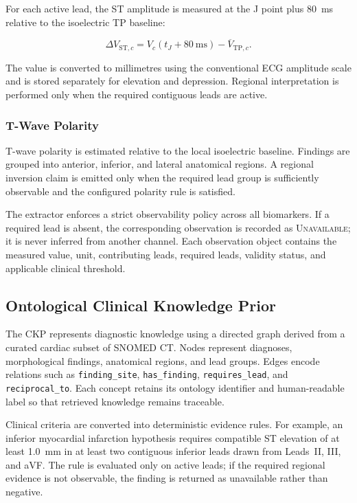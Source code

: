 \documentclass{ssnreview}
\begin{document}
For each active lead, the ST amplitude is measured at the J point plus 80~ms relative to
the isoelectric TP baseline:

\begin{equation}
  \Delta V_{\mathrm{ST},c}
  =V_c(t_J+80\ \mathrm{ms})-\overline{V}_{\mathrm{TP},c}.
  \label{eq:st-measurement}
\end{equation}

The value is converted to millimetres using the conventional ECG amplitude scale and is
stored separately for elevation and depression. Regional interpretation is performed only
when the required contiguous leads are active.

\subsubsection{T-Wave Polarity}

T-wave polarity is estimated relative to the local isoelectric baseline. Findings are
grouped into anterior, inferior, and lateral anatomical regions. A regional inversion claim
is emitted only when the required lead group is sufficiently observable and the configured
polarity rule is satisfied.

The extractor enforces a strict observability policy across all biomarkers. If a required
lead is absent, the corresponding observation is recorded as \textsc{Unavailable}; it is
never inferred from another channel. Each observation object contains the measured value,
unit, contributing leads, required leads, validity status, and applicable clinical threshold.

\subsection{Ontological Clinical Knowledge Prior}

The CKP represents diagnostic knowledge using a directed graph derived from a curated
cardiac subset of SNOMED CT. Nodes represent diagnoses, morphological findings,
anatomical regions, and lead groups. Edges encode relations such as
\texttt{finding\_site}, \texttt{has\_finding}, \texttt{requires\_lead}, and
\texttt{reciprocal\_to}. Each concept retains its ontology identifier and human-readable
label so that retrieved knowledge remains traceable.

Clinical criteria are converted into deterministic evidence rules. For example, an inferior
myocardial infarction hypothesis requires compatible ST elevation of at least 1.0~mm in
at least two contiguous inferior leads drawn from Leads~II, III, and aVF. The rule is
evaluated only on active leads; if the required regional evidence is not observable, the
finding is returned as unavailable rather than negative.
\end{document}
